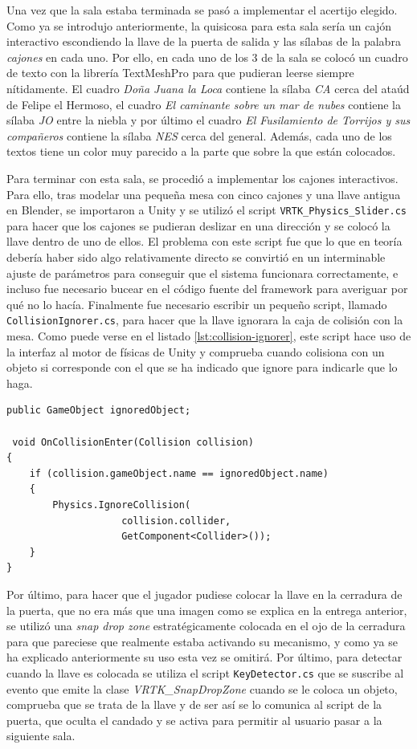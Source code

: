 Una vez que la sala estaba terminada se pasó a implementar el acertijo elegido. Como ya se introdujo anteriormente, la quisicosa para esta sala sería un cajón interactivo escondiendo la llave de la puerta de salida y las sílabas de la palabra \textit{cajones} en cada uno. Por ello, en cada uno de los 3 de la sala se colocó un cuadro de texto con la librería TextMeshPro para que pudieran leerse siempre nítidamente. El cuadro \textit{Doña Juana la Loca} contiene la sílaba \textit{CA} cerca del ataúd de Felipe el Hermoso, el cuadro \textit{El caminante sobre un mar de nubes} contiene la sílaba \textit{JO} entre la niebla y por último el cuadro \textit{El Fusilamiento de Torrijos y sus compañeros} contiene la sílaba \textit{NES} cerca del general. Además, cada uno de los textos tiene un color muy parecido a la parte que sobre la que están colocados.

Para terminar con esta sala, se procedió a implementar los cajones interactivos. Para ello, tras modelar una pequeña mesa con cinco cajones y una llave antigua en Blender, se importaron a Unity y se utilizó el script \texttt{VRTK\_Physics\_Slider.cs} para hacer que los cajones se pudieran deslizar en una dirección y se colocó la llave dentro de uno de ellos. El problema con este script fue que lo que en teoría debería haber sido algo relativamente directo se convirtió en un interminable ajuste de parámetros para conseguir que el sistema funcionara correctamente, e incluso fue necesario bucear en el código fuente del framework para averiguar por qué no lo hacía. Finalmente fue necesario escribir un pequeño script, llamado \texttt{CollisionIgnorer.cs}, para hacer que la llave ignorara la caja de colisión con la mesa. Como puede verse en el listado \ref{lst:collision-ignorer}, este script hace uso de la interfaz al motor de físicas de Unity y comprueba cuando colisiona con un objeto si corresponde con el que se ha indicado que ignore para indicarle que lo haga.

\begin{lstlisting}[caption=Fragmento del script para ignorar colisiones, label=lst:collision-ignorer]
public GameObject ignoredObject;

 void OnCollisionEnter(Collision collision)
{
    if (collision.gameObject.name == ignoredObject.name)
    {
        Physics.IgnoreCollision(
                    collision.collider, 
                    GetComponent<Collider>());
    }
}
\end{lstlisting}

Por último, para hacer que el jugador pudiese colocar la llave en la cerradura de la puerta, que no era más que una imagen como se explica en la entrega anterior, se utilizó una \textit{snap drop zone} estratégicamente colocada en el ojo de la cerradura para que pareciese que realmente estaba activando su mecanismo, y como ya se ha explicado anteriormente su uso esta vez se omitirá. Por último, para detectar cuando la llave es colocada se utiliza el script \texttt{KeyDetector.cs} que se suscribe al evento que emite la clase \textit{VRTK\_SnapDropZone} cuando se le coloca un objeto, comprueba que se trata de la llave y de ser así se lo comunica al script de la puerta, que oculta el candado y se activa para permitir al usuario pasar a la siguiente sala.

